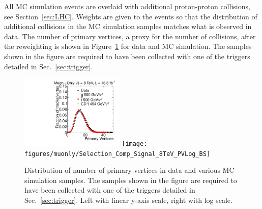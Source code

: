 All MC simulation events are overlaid with additional proton-proton collisions, see Section~\ref{sec:LHC}.
Weights are given to the events so that the distribution of additional collisions in the MC simulation samples matches what is observed in data.
The number of primary vertices, a proxy for the number of collisions, after the reweighting is shown in Figure~\ref{fig:PV} for data and MC simulation.
The samples shown in the figure are required to have been collected with one of the triggers detailed in Sec.~\ref{sec:trigger}.

\begin{figure}
  \begin{center}
      \includegraphics[clip=false, trim=0.0cm 0cm 0.0cm 0cm, width=0.44\textwidth]{figures/muonly/Selection_Comp_Signal_8TeV_PV_BS}
      \texttt{[image: figures/muonly/Selection\_Comp\_Signal\_8TeV\_PVLog\_BS]} \\
  \end{center}
        \caption[Distribution of number of primary vertices in data and various MC simulation samples]
{Distribution of number of primary vertices in data and various MC simulation samples. 
The samples shown in the figure are required to have been collected with one of the triggers detailed in Sec.~\ref{sec:trigger}.
Left with linear y-axis scale, right with log scale.
        }
      \label{fig:PV}
\end{figure}